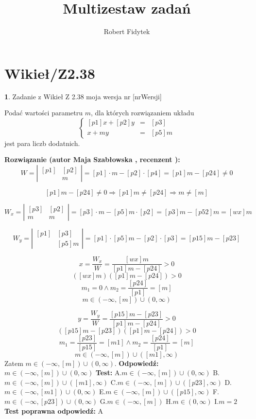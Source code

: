 \documentclass[12pt, a4paper]{article}
\title{Multizestaw zadań}
\author{Robert Fidytek}
\date{}
\theoremstyle{definition} %
\newtheorem{zad}{}
\newcommand{\kategoria}[1]{\section{#1}} %
\newcommand{\zadStart}[1]{\begin{zad}#1\newline} %
\newcommand{\zadStop}{\end{zad}}   %
\newcommand{\rozwStart}[2]{\noindent \textbf{Rozwiązanie (autor #1 , recenzent #2): }\newline} %
\newcommand{\rozwStop}{\newline}                                            %
\newcommand{\odpStart}{\noindent \textbf{Odpowiedź:}\newline}    %
\newcommand{\odpStop}{\newline}                                             %
\newcommand{\testStart}{\noindent \textbf{Test:}\newline} %
\newcommand{\testStop}{\newline} %
\newcommand{\kluczStart}{\noindent \textbf{Test poprawna odpowiedź:}\newline} %
\newcommand{\kluczStop}{\newline} %
\begin{document}
\maketitle


\kategoria{Wikieł/Z2.38}
\zadStart{Zadanie z Wikieł Z 2.38  moja wersja nr [nrWersji]}


Podać wartości parametru $m$, dla których rozwiązaniem układu
$$\left\{\begin{array}{rcl}
[p1]x+[p2]y&=&[p3]\\
[p4]x+my&=&[p5]m
\end{array} \right.$$
jest para liczb dodatnich.
\zadStop
\rozwStart{Maja Szabłowska}{}
$$W=\left| \begin{array}{lccr} [p1] & [p2]  \\ [p4] & m \end{array}\right| = [p1]\cdot m - [p2]\cdot [p4]=[p1]m-[p24] \neq 0$$

$$[p1]m-[p24] \neq 0 \Rightarrow [p1]m\neq [p24] \Rightarrow m\neq [m]$$

$$W_{x}=\left| \begin{array}{lccr} [p3] & [p2] \\ [p5]m & m \end{array}\right| = [p3]\cdot m - [p5]m\cdot [p2]=[p3]m-[p52]m=[wx]m$$

$$W_{y}=\left| \begin{array}{lccr} [p1] & [p3]  \\ [p4] & [p5]m \end{array}\right| = [p1]\cdot[p5]m - [p2]\cdot[p3]=[p15]m-[p23]$$

$$x=\frac{W_{x}}{W}=\frac{[wx]m}{[p1]m-[p24]}>0$$
$$([wx]m)([p1]m-[p24])>0$$ 
$$m_{1}=0 \land m_{2}=\frac{[p24]}{[p1]}=[m] $$
$$m\in(-\infty,[m])\cup(0,\infty)$$

$$y=\frac{W_{y}}{W}=\frac{[p15]m-[p23]}{[p1]m-[p24]}>0$$
$$([p15]m-[p23])([p1]m-[p24])>0$$ 
$$m_{1}=\frac{[p23]}{[p15]}=[m1] \land m_{2}=\frac{[p24]}{[p1]}=[m] $$
$$m\in(-\infty,[m])\cup([m1],\infty)$$
Zatem $m\in(-\infty,[m])\cup(0,\infty).$
\rozwStop
\odpStart
$m\in(-\infty,[m])\cup(0,\infty)$
\odpStop
\testStart
A.$m\in(-\infty,[m])\cup(0,\infty)$
B.$m\in(-\infty,[m])\cup([m1],\infty)$
C.$m\in(-\infty,[m])\cup([p23],\infty)$
D.$m\in(-\infty,[m1])\cup(0,\infty)$
E.$m\in(-\infty,[m])\cup([p15],\infty)$
F.$m\in(-\infty,[p23])\cup(0,\infty)$
G.$m\in(-\infty,[m])$
H.$m\in(0,\infty)$
I.$m=2$
\testStop
\kluczStart
A
\kluczStop
\end{document}
